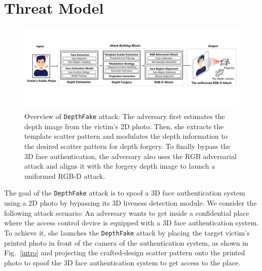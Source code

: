 \section{Threat Model}


\begin{figure}[pt]
	\centerline{\includegraphics[width = \textwidth]{figures/overview.pdf}}
	\vspace{-0.1in}
	\caption{Overview of \texttt{DepthFake} attack: The adversary first estimates the depth image from the victim's 2D photo. Then, she extracts the template scatter pattern and modulates the depth information to the desired scatter pattern for depth forgery. To finally bypass the 3D face authentication, the adversary also uses the RGB adversarial attack and aligns it with the forgery depth image to launch a uniformed RGB-D attack.}
	\label{overview}
	\vspace{-0.15in}
\end{figure}

The goal of the \texttt{DepthFake} attack is to spoof a 3D face authentication system using a 2D photo by bypassing its 3D liveness detection module. We consider the following attack scenario: An adversary wants to get inside a confidential place where the access control device is equipped with  a 3D face authentication system. To achieve it, she launches the \texttt{DepthFake} attack by placing the target victim's printed photo in front of the camera of the authentication system, as shown in Fig.~\ref{intro} and projecting the crafted-design scatter pattern onto the printed photo to spoof the 3D face authentication system to get access to the place.
%
%


